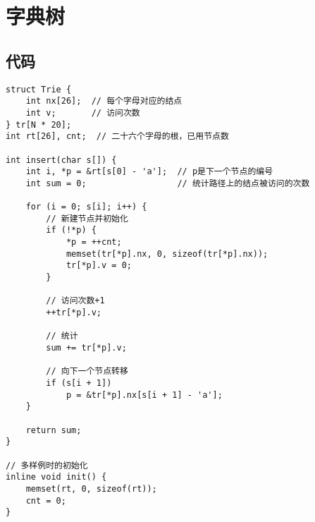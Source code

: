 \section{字典树}
    \subsection{代码}
\begin{lstlisting}
struct Trie {
    int nx[26];  // 每个字母对应的结点
    int v;       // 访问次数
} tr[N * 20];
int rt[26], cnt;  // 二十六个字母的根，已用节点数

int insert(char s[]) {
    int i, *p = &rt[s[0] - 'a'];  // p是下一个节点的编号
    int sum = 0;                  // 统计路径上的结点被访问的次数

    for (i = 0; s[i]; i++) {
        // 新建节点并初始化
        if (!*p) {
            *p = ++cnt;
            memset(tr[*p].nx, 0, sizeof(tr[*p].nx));
            tr[*p].v = 0;
        }

        // 访问次数+1
        ++tr[*p].v;

        // 统计
        sum += tr[*p].v;

        // 向下一个节点转移
        if (s[i + 1])
            p = &tr[*p].nx[s[i + 1] - 'a'];
    }

    return sum;
}

// 多样例时的初始化
inline void init() {
    memset(rt, 0, sizeof(rt));
    cnt = 0;
}
\end{lstlisting}